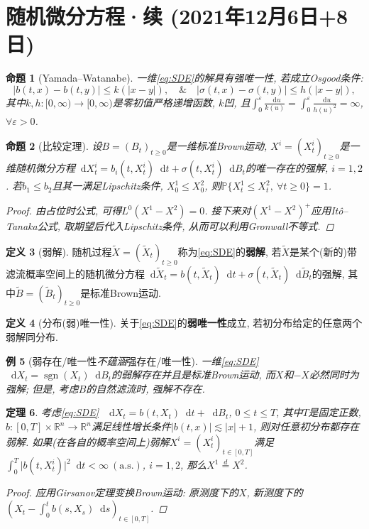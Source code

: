 \documentclass{ctexart}
\theoremstyle{definition}
\newtheorem{Def}{定义}[section]
\theoremstyle{remark}
\theoremstyle{plain}
\newtheorem{Prop}[Def]{命题}
\newtheorem{Thm}[Def]{定理}
\newtheorem{Eg}[Def]{例}
\newcommand{\1}{\mathbbm{1}}				%
\newcommand{\as}{\mathrm{a.s.}}				%
\renewcommand{\P}{\mathbb{P}}				%
\newcommand{\sgn}[1]{\operatorname{sgn}(#1)}	%
\newcommand{\abs}[1]{\lvert#1\rvert}			%
\newcommand{\R}{\mathbb{R}}					%
\renewcommand*{\d}{\mathop{}\!\mathrm{d}}	%
\newcommand{\eps}{\varepsilon}
\begin{document}
\section{随机微分方程·续 \normalfont\footnotesize (2021年12月6日+8日)}
\begin{Prop}[Yamada--Watanabe]
一维\ref{eq:SDE}的解具有强唯一性, 若成立Osgood条件:
\[ \abs{b(t,x)-b(t,y)} \le k(\abs{x-y}) , \quad\&\quad \abs{\sigma(t,x)-\sigma(t,y)} \le h(\abs{x-y}) , \]
其中$k,h : [0,\infty) \to [0,\infty)$是零初值严格递增函数, $k$凹, 且$\int_{0}^{\eps} \frac{\d u}{k(u)} = \int_{0}^{\eps} \frac{\d u}{h(u)^{2}} = \infty$, $\forall \eps > 0$.
\end{Prop}\clearpage

\begin{Prop}[比较定理]\label{Prop:comparison}
设$B = (B_{t})_{t \ge 0}$是一维标准Brown运动, $X^{i} = (X^{i}_{t})_{t \ge 0}$是一维随机微分方程$\d X^{i}_{t} = b_{i}(t,X^{i}_{t}) \d t + \sigma(t,X^{i}_{t}) \d B_{t}$的唯一存在的强解, $i = 1,2$. 若$b_{1} \le b_{2}$且其一满足Lipschitz条件, $X^{1}_{0} \le X^{2}_{0}$, 则$\P\{ X^{1}_{t} \le X^{2}_{t} ,\ \forall t \ge 0 \} = 1$.
\begin{proof}
由占位时公式, 可得$L^{0}(X^{1}-X^{2}) = 0$. 接下来对$(X^{1}-X^{2})^{+}$应用It\^{o}--Tanaka公式, 取期望后代入Lipschitz条件, 从而可以利用Gronwall不等式.
\end{proof}
\end{Prop}


\begin{Def}[弱解]
随机过程$\tilde{X} = (\tilde{X}_{t})_{t \ge 0}$称为\eqref{eq:SDE}的\textbf{弱解}, 若$\tilde{X}$是某个(新的)带滤流概率空间上的随机微分方程$\d\tilde{X}_{t} = b(t,\tilde{X}_{t}) \d t + \sigma(t,\tilde{X}_{t}) \d\tilde{B}_{t}$的强解, 其中$\tilde{B} = (\tilde{B}_{t})_{t \ge 0}$是标准Brown运动.
\end{Def}
\begin{Def}[分布(弱)唯一性]
关于\eqref{eq:SDE}的\textbf{弱唯一性}成立, 若初分布给定的任意两个弱解同分布.
\end{Def}

\begin{Eg}[弱存在/唯一性\emph{不蕴涵}强存在/唯一性]
一维\ref{eq:SDE}~$\d X_{t} = \sgn{X_{t}} \d B_{t}$的弱解存在并且是标准Brown运动, 而$X$和$-X$必然同时为强解; 但是, 考虑$B$的自然滤流时, 强解不存在. 
\end{Eg}

\begin{Thm}
考虑\ref{eq:SDE}~$\d X_{t} = b(t,X_{t}) \d t + \d B_{t}$, $0 \le t \le T$, 其中$T$是固定正数, $b : [0,T]\times\R^{n} \to \R^{n}$满足线性增长条件$\abs{b(t,x)} \lesssim \abs{x} + 1$, 则对任意初分布都存在弱解. 如果(在各自的概率空间上)弱解$X^{i} = (X^{i}_{t})_{t \in [0,T]}$满足$\int_{0}^{T} \abs{b(t,X^{i}_{t})}^{2} \d t < \infty ~(\as)$, $i = 1,2$, 那么$X^{1} \stackrel{d}{=} X^{2}$.
\begin{proof}
应用Girsanov定理变换Brown运动: 原测度下的$X$, 新测度下的$(X_{t} - \int_{0}^{t} b(s,X_{s}) \d s)_{t \in [0,T]}$.
\end{proof}
\end{Thm}
\end{document}
